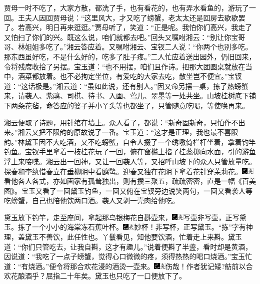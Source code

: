贾母一时不吃了，大家方散，都洗了手，也有看花的，也有弄水看鱼的，游玩了一回。王夫人因回贾母说：“这里风大，才又吃了螃蟹，老太太还是回房去歇歇罢了。若高兴，明日再来逛逛。”贾母听了，笑道：“正是呢。我怕你们高兴，我走了又怕扫了你们的兴。既这么说，咱们就都去吧。”回头又嘱咐湘云：“别让你宝哥哥、林姐姐多吃了。”湘云答应着。又嘱咐湘云、宝钗二人说：“你两个也别多吃。那东西虽好吃，不是什么好的，吃多了肚子疼。”二人忙应着送出园外，仍旧回来，令将残席收拾了另摆。宝玉道：“也不用摆，咱们且作诗。把那大团圆桌就放在当中，酒菜都放着。也不必拘定坐位，有爱吃的大家去吃，散坐岂不便宜。”宝钗道：“这话极是。”湘云道：“虽如此说，还有别人。”因又命另摆一桌，拣了热螃蟹来，请袭人、紫鹃、司棋、待书、入画、莺儿、翠墨等一处共坐。山坡桂树底下铺下两条花毡，命答应的婆子并小丫头等也都坐了，只管随意吃喝，等使唤再来。

湘云便取了诗题，用针绾在墙上。众人看了，都说：“新奇固新奇，只怕作不出来。”湘云又把不限韵的原故说了一番。宝玉道：“这才是正理，我也最不喜限韵。”林黛玉因不大吃酒，又不吃螃蟹，自令人掇了一个绣墩倚栏杆坐着，拿着钓竿钓鱼。宝钗手里拿着一枝桂花玩了一回，俯在窗槛上掐了桂蕊掷向水面，引的游鱼浮上来唼喋。湘云出一回神，又让一回袭人等，又招呼山坡下的众人只管放量吃。探春和李纨惜春立在垂柳阴中看鸥鹭。迎春又独在花阴下拿着花针穿茉莉花。{\includegraphics[width=3mm]{../Images/00003}\includegraphics[width=3mm]{../Images/00012}\footnotesize \kaishu 看他各人各式，亦如画家有孤耸独出，则有攒三聚五，疏疏密密，直是一幅《百美图》。}宝玉又看了一回黛玉钓鱼，一回又俯在宝钗旁边说笑两句，一回又看袭人等吃螃蟹，自己也陪他饮两口酒。袭人又剥一壳肉给他吃。

黛玉放下钓竿，走至座间，拿起那乌银梅花自斟壶来，{\includegraphics[width=3mm]{../Images/00003}\includegraphics[width=3mm]{../Images/00012}\footnotesize \kaishu 写壶非写壶，正写黛玉。}拣了一个小小的海棠冻石蕉叶杯。{\includegraphics[width=3mm]{../Images/00003}\includegraphics[width=3mm]{../Images/00012}\footnotesize \kaishu 妙杯！非写杯，正写黛玉。“拣”字有神理，盖黛玉不善饮，此任性也。}丫鬟看见，知他要饮酒，忙着走上来斟。黛玉道：“你们只管吃去，让我自斟，这才有趣儿。”说着便斟了半盏，看时却是黄酒，因说道：“我吃了一点子螃蟹，觉得心口微微的疼，须得热热的喝口烧酒。”宝玉忙道：“有烧酒。”便令将那合欢花浸的酒烫一壶来。{{\includegraphics[width=3mm]{../Images/00003}\includegraphics[width=3mm]{../Images/00012}\footnotesize \kaishu 伤哉！作者犹记矮}?{舫前以合欢花酿酒乎？屈指二十年矣。}}黛玉也只吃了一口便放下了。

